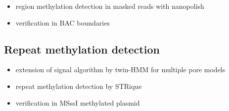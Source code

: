 \begin{itemize}
	\item region methylation detection in masked reads with nanopolish
	\item verification in BAC boundaries
\end{itemize}

\subsection{Repeat methylation detection}
\label{subsec:strique:modifications_repeat}

\begin{itemize}
	\item extension of signal algorithm by twin-HMM for multiple pore models
	\item repeat methylation detection by STRique
	\item verification in MSssI methylated plasmid
\end{itemize}

